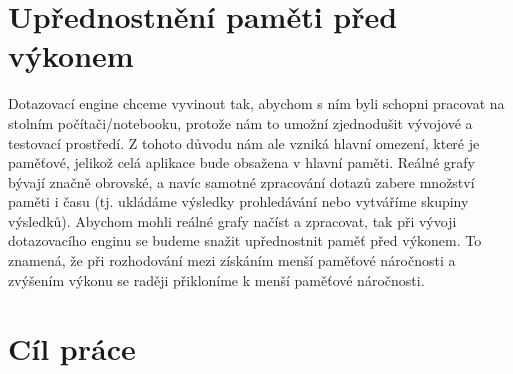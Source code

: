 \section*{Upřednostnění paměti před výkonem}

Dotazovací engine chceme vyvinout tak, abychom s ním byli schopni pracovat na stolním počítači/notebooku, protože nám to umožní zjednodušit vývojové a testovací prostředí.
Z tohoto důvodu nám ale vzniká hlavní omezení, které je paměťové, jelikož celá aplikace bude obsažena v hlavní paměti.
Reálné grafy bývají značně obrovské, a navíc samotné zpracování dotazů zabere množství paměti i času (tj. ukládáme výsledky prohledávání nebo vytváříme skupiny výsledků).
Abychom mohli reálné grafy načíst a zpracovat, tak při vývoji dotazovacího enginu se budeme snažit upřednostnit paměť před výkonem.
To znamená, že při rozhodování mezi získáním menší paměťové náročnosti a zvýšením výkonu se raději přikloníme k menší paměťové náročnosti.  
\section*{Cíl práce}

